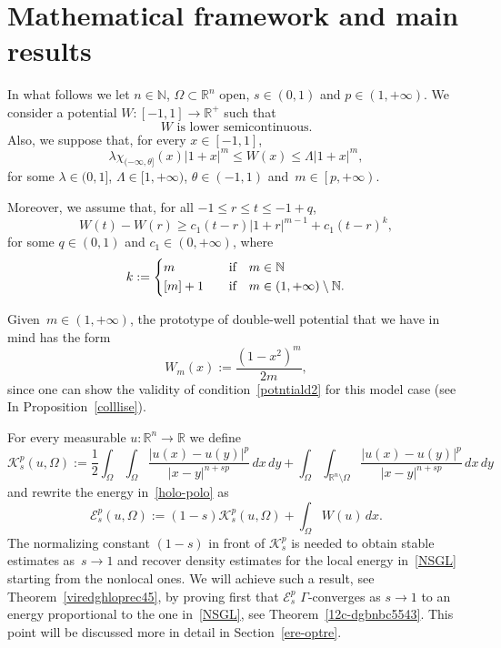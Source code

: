 \documentclass[12pt]{article}
\newcommand{\R}{\mathbb{R}}
\newcommand{\N}{\mathbb{N}}
\numberwithin{equation}{section}
\renewcommand{\leq}{\leqslant}
\renewcommand{\geq}{\geqslant}
\begin{document}
\section{Mathematical framework and main results}
In what follows we let $n\in\N$, $\Omega\subset\R^n$ open, $s\in(0,1)$ and $p\in(1,+\infty)$. We consider a potential $W:[-1,1]\to\R^+$ such that 
\begin{equation}\label{po12345}
W\mbox{  is lower semicontinuous}.
\end{equation} 
Also, we suppose that, for every $x\in [-1,1]$,
\begin{equation}\label{potential}
\lambda\chi_{(-\infty,\theta]}(x)\left|1+x\right|^{m}   \leq W(x)\leq \Lambda\left|1+x\right|^m,
\end{equation}
for some $\lambda\in (0,1]$, $\Lambda\in [1,+\infty)$, $\theta\in (-1,1)$ and~$m\in \left[p,+\infty\right)$.

Moreover, we assume that, for all $-1\leq r\leq t\leq -1+q$,
\begin{equation}\label{potntiald2}
W(t)-W(r)\geq c_1(t-r)\left|1+r\right|^{m-1}+c_1(t-r)^k,
\end{equation}
for some $q\in (0,1)$ and $c_1\in (0,+\infty)$,
where 
\begin{equation}\label{key?}
k:=\begin{dcases}
m\quad &\mbox{if}\quad m\in \N\\
\left[m\right]+1 \quad &\mbox{if}\quad m \in(1,+\infty)\setminus \N. 
\end{dcases}
\end{equation}

Given~$m\in (1,+\infty)$, the prototype of double-well potential that we have in mind has the form
\begin{equation*}
W_m(x):=\frac{(1-x^2)^m}{2m}, 
\end{equation*}
since one can show the validity of condition~\eqref{potntiald2} for this model case (see
In Proposition~\ref{colllise}).

For every measurable $u:\R^n\to \R$ we define
\begin{equation}\label{kinetic}
\mathcal{K}_s^p(u,\Omega):=\frac{1}{2}\int_{\Omega}\int_{\Omega}\frac{\left|u(x)-u(y)\right|^p}{\left|x-y\right|^{n+sp}}\,dx\,dy +\int_{\Omega}\int_{\R^n\setminus \Omega}\frac{\left|u(x)-u(y)\right|^p}{\left|x-y\right|^{n+sp}}\,dx\,dy
\end{equation} 
and rewrite the energy in~\eqref{holo-polo} as
\begin{equation}\label{energy}
\mathcal{E}_{s}^p(u,\Omega):= (1-s)\mathcal{K}_s^p(u,\Omega)+\int_{\Omega}W(u)\,dx.
\end{equation}
The normalizing constant $(1-s)$ in front of $\mathcal{K}_s^p$ is needed to obtain
stable estimates as~$s\to1$ and
recover density estimates for the local energy in~\eqref{NSGL} starting from the nonlocal ones. We will achieve such a result, see Theorem~\ref{viredghloprec45}, by proving first that $\mathcal{E}_s^p$ $\Gamma$-converges as $s\to 1$ to an energy proportional to the one in~\eqref{NSGL}, see Theorem~\ref{12c-dgbnbc5543}. This point will be discussed more in detail in Section~\ref{ere-optre}. 
\end{document}
